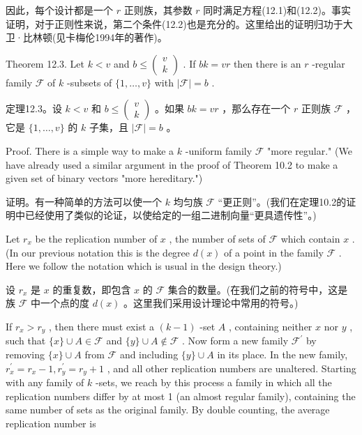 \documentclass[10pt]{article}
\begin{document}
\begin{tcolorbox}\relax
因此，每个设计都是一个 \(r\) 正则族，其参数 \(r\) 同时满足方程(12.1)和(12.2)。事实证明，对于正则性来说，第二个条件(12.2)也是充分的。这里给出的证明归功于大卫·比林顿(见卡梅伦1994年的著作)。
\end{tcolorbox}

Theorem 12.3. Let \(k < v\) and \(b \leq  \left( \begin{array}{l} v \\  k \end{array}\right)\) . If \({bk} = {vr}\) then there is an \(r\) -regular family \(\mathcal{F}\) of \(k\) -subsets of \(\{ 1,\ldots ,v\}\) with \(\left| \mathcal{F}\right|  = b\) .

\begin{tcolorbox}\relax
定理12.3。设 \(k < v\) 和 \(b \leq  \left( \begin{array}{l} v \\  k \end{array}\right)\) 。如果 \({bk} = {vr}\) ，那么存在一个 \(r\) 正则族 \(\mathcal{F}\) ，它是 \(\{ 1,\ldots ,v\}\) 的 \(k\) 子集，且 \(\left| \mathcal{F}\right|  = b\) 。
\end{tcolorbox}

Proof. There is a simple way to make a \(k\) -uniform family \(\mathcal{F}\) "more regular." (We have already used a similar argument in the proof of Theorem 10.2 to make a given set of binary vectors "more hereditary.")

\begin{tcolorbox}\relax
证明。有一种简单的方法可以使一个 \(k\) 均匀族 \(\mathcal{F}\) “更正则”。(我们在定理10.2的证明中已经使用了类似的论证，以使给定的一组二进制向量“更具遗传性”。)
\end{tcolorbox}

Let \({r}_{x}\) be the replication number of \(x\) , the number of sets of \(\mathcal{F}\) which contain \(x\) . (In our previous notation this is the degree \(d\left( x\right)\) of a point in the family \(\mathcal{F}\) . Here we follow the notation which is usual in the design theory.)

\begin{tcolorbox}\relax
设 \({r}_{x}\) 是 \(x\) 的重复数，即包含 \(x\) 的 \(\mathcal{F}\) 集合的数量。(在我们之前的符号中，这是族 \(\mathcal{F}\) 中一个点的度 \(d\left( x\right)\) 。这里我们采用设计理论中常用的符号。)
\end{tcolorbox}

If \({r}_{x} > {r}_{y}\) , then there must exist a \(\left( {k - 1}\right)\) -set \(A\) , containing neither \(x\) nor \(y\) , such that \(\{ x\}  \cup  A \in  \mathcal{F}\) and \(\{ y\}  \cup  A \notin  \mathcal{F}\) . Now form a new family \({\mathcal{F}}^{\prime }\) by removing \(\{ x\}  \cup  A\) from \(\mathcal{F}\) and including \(\{ y\}  \cup  A\) in its place. In the new family, \({r}_{x}^{\prime } = {r}_{x} - 1,{r}_{y}^{\prime } = {r}_{y} + 1\) , and all other replication numbers are unaltered. Starting with any family of \(k\) -sets, we reach by this process a family in which all the replication numbers differ by at most 1 (an almost regular family), containing the same number of sets as the original family. By double counting, the average replication number is
\end{document}
